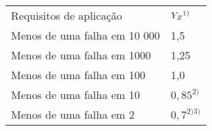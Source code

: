 \begin{table}
\centering

\begin{tabular}{ll}
Requisitos de aplicação      & $Y_Z \\ ^{1)}$    \\
Menos de uma falha em 10 000 & 1,5       \\
Menos de uma falha em 1000   & 1,25      \\
Menos de uma falha em 100    & 1,0       \\
Menos de uma falha em 10     & $0,85 ^{2)}$   \\
Menos de uma falha em 2      & $0,7^{2) 3)}$
\end{tabular}
\end{table}
